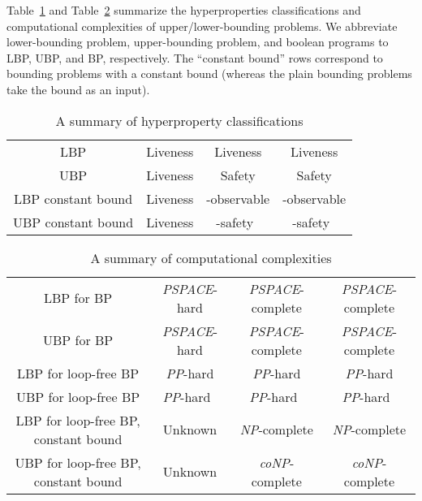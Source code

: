 \documentclass[]{eptcs}
\begin{document}
Table~\ref{fig:hysummary} and Table~\ref{fig:comsummary} summarize the
hyperproperties classifications and computational complexities of
upper/lower-bounding problems.  We abbreviate lower-bounding problem,
upper-bounding problem, and boolean programs to LBP, UBP, and BP,
respectively.  The ``constant bound'' rows correspond to bounding
problems with a constant bound (whereas the plain bounding problems
take the bound as an input).
\begin{table}
\begin{center}
  \begin{tabular}{|c|c|c|c|}
    \hline
    &  &  & \\
    \hline
    LBP& Liveness & Liveness & Liveness\\
    \hline
    UBP& Liveness & Safety & Safety\\
    \hline
    LBP constant bound& Liveness & -observable & -observable\\
    \hline
    UBP constant bound& Liveness & -safety~\cite{DBLP:conf/esorics/YasuokaT10} & -safety~\cite{DBLP:conf/esorics/YasuokaT10}\\
    \hline
\end{tabular}
\end{center}
  \caption{A summary of hyperproperty classifications}
\label{fig:hysummary}
\end{table}
\begin{table}
\begin{center}
  \begin{tabular}{|c|c|c|c|}
    \hline
    &  &  & \\
    \hline
    LBP for BP& {\it PSPACE}-hard& {\it PSPACE}-complete& {\it PSPACE}-complete\\
    \hline
    UBP for BP& {\it PSPACE}-hard & {\it PSPACE}-complete& {\it PSPACE}-complete\\
    \hline
    LBP for loop-free BP& {\it PP}-hard & {\it PP}-hard & {\it PP}-hard\\
    \hline
    UBP for loop-free BP& {\it PP}-hard~\cite{DBLP:conf/esorics/YasuokaT10} & {\it PP}-hard~\cite{DBLP:conf/esorics/YasuokaT10} & {\it PP}-hard~\cite{DBLP:conf/esorics/YasuokaT10}\\
    \hline
    LBP for loop-free BP, constant bound& Unknown & {\it NP}-complete & {\it NP}-complete\\
    \hline
    UBP for loop-free BP, constant bound& Unknown & {\it coNP}-complete & {\it coNP}-complete\\
    \hline
\end{tabular}
\end{center}
\caption{A summary of computational complexities}
\label{fig:comsummary}
\end{table}
\end{document}
